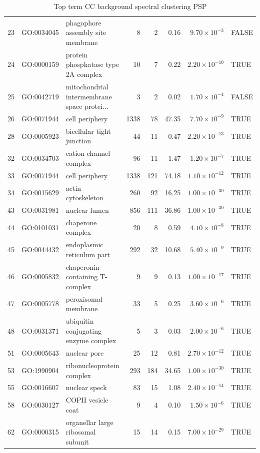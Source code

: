 \begin{table}[ht]
\begin{adjustbox}{max width=\textwidth}
\begin{tabular}{lllrrrrl}
  23 & GO:0034045 & phagophore assembly site membrane & 8 & 2 & 0.16 & $9.70 \times 10^{-3}$ & FALSE \\ 
  24 & GO:0000159 & protein phosphatase type 2A complex & 10 & 7 & 0.22 & $2.20 \times 10^{-10}$ & TRUE \\ 
  25 & GO:0042719 & mitochondrial intermembrane space protei... & 3 & 2 & 0.02 & $1.70 \times 10^{-4}$ & FALSE \\ 
  26 & GO:0071944 & cell periphery & 1338 & 78 & 47.35 & $7.70 \times 10^{-9}$ & TRUE \\ 
  28 & GO:0005923 & bicellular tight junction & 44 & 11 & 0.47 & $2.20 \times 10^{-13}$ & TRUE \\ 
  32 & GO:0034703 & cation channel complex & 96 & 11 & 1.47 & $1.20 \times 10^{-7}$ & TRUE \\ 
  33 & GO:0071944 & cell periphery & 1338 & 121 & 74.18 & $1.10 \times 10^{-12}$ & TRUE \\ 
  34 & GO:0015629 & actin cytoskeleton & 260 & 92 & 16.25 & $1.00 \times 10^{-30}$ & TRUE \\ 
  43 & GO:0031981 & nuclear lumen & 856 & 111 & 36.86 & $1.00 \times 10^{-30}$ & TRUE \\ 
  44 & GO:0101031 & chaperone complex & 20 & 8 & 0.59 & $4.10 \times 10^{-8}$ & TRUE \\ 
  45 & GO:0044432 & endoplasmic reticulum part & 292 & 32 & 10.68 & $5.40 \times 10^{-9}$ & TRUE \\ 
  46 & GO:0005832 & chaperonin-containing T-complex & 9 & 9 & 0.13 & $1.00 \times 10^{-17}$ & TRUE \\ 
  47 & GO:0005778 & peroxisomal membrane & 33 & 5 & 0.25 & $3.60 \times 10^{-6}$ & TRUE \\ 
  48 & GO:0031371 & ubiquitin conjugating enzyme complex & 5 & 3 & 0.03 & $2.00 \times 10^{-6}$ & TRUE \\ 
  51 & GO:0005643 & nuclear pore & 25 & 12 & 0.81 & $2.70 \times 10^{-12}$ & TRUE \\ 
  53 & GO:1990904 & ribonucleoprotein complex & 293 & 184 & 34.65 & $1.00 \times 10^{-30}$ & TRUE \\ 
  55 & GO:0016607 & nuclear speck & 83 & 15 & 1.08 & $2.40 \times 10^{-14}$ & TRUE \\ 
  58 & GO:0030127 & COPII vesicle coat & 9 & 4 & 0.10 & $1.50 \times 10^{-6}$ & TRUE \\ 
  62 & GO:0000315 & organellar large ribosomal subunit & 15 & 14 & 0.15 & $7.00 \times 10^{-29}$ & TRUE \\ 
   \hline
\end{tabular}
\end{adjustbox}
\caption{Top term CC background spectral clustering PSP} 
\label{tab:Top term CC background spectral clustering PSP}
\end{table}

